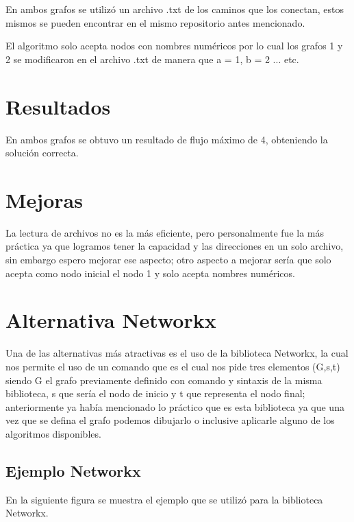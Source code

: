 \documentclass{report}
\begin{document}
En ambos grafos se utilizó un archivo .txt de los caminos que los conectan, estos mismos se pueden encontrar en el mismo repositorio antes mencionado.

El algoritmo solo acepta nodos con nombres numéricos por lo cual los grafos 1 y 2 se modificaron en el archivo .txt de manera que a = 1, b = 2 ... etc.

\section{Resultados}
En ambos grafos se obtuvo un resultado de flujo máximo de 4, obteniendo la solución correcta.

\section{Mejoras}
La lectura de archivos no es la más eficiente, pero personalmente fue la más práctica ya que logramos tener la capacidad y las direcciones en un solo archivo, sin embargo espero mejorar ese aspecto; otro aspecto a mejorar sería que solo acepta como nodo inicial el nodo 1 y solo acepta nombres numéricos.

\section{Alternativa Networkx}
Una de las alternativas más atractivas es el uso de la biblioteca Networkx, la cual nos permite el uso de un comando que es \textit{} el cual nos pide tres elementos (G,s,t) siendo G el grafo previamente definido con comando y sintaxis de la misma biblioteca, s que sería el nodo de inicio y t que representa el nodo final; anteriormente ya había mencionado lo práctico que es esta biblioteca ya que una vez que se defina el grafo podemos dibujarlo o inclusive aplicarle alguno de los algoritmos disponibles.

\subsection{Ejemplo Networkx}
En la siguiente figura se muestra el ejemplo que se utilizó para la biblioteca Networkx.
\end{document}
